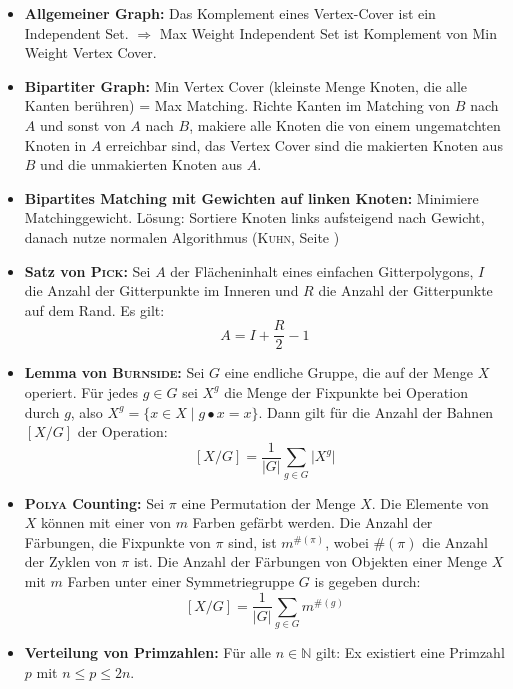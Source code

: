 \begin{itemize}
	\item \textbf{Allgemeiner Graph:}
	Das Komplement eines Vertex-Cover ist ein Independent Set.
	$\Rightarrow$ Max Weight Independent Set ist Komplement von Min Weight Vertex Cover.

	\item \textbf{Bipartiter Graph:}
	Min Vertex Cover (kleinste Menge Knoten, die alle Kanten berühren) = Max Matching.
	Richte Kanten im Matching von $B$ nach $A$ und sonst von $A$ nach $B$, makiere alle Knoten die von einem ungematchten Knoten in $A$ erreichbar sind, das Vertex Cover sind die makierten Knoten aus $B$ und die unmakierten Knoten aus $A$.

	\item \textbf{Bipartites Matching mit Gewichten auf linken Knoten:}
	Minimiere Matchinggewicht.
	Lösung: Sortiere Knoten links aufsteigend nach Gewicht, danach nutze normalen Algorithmus (\textsc{Kuhn}, Seite \pageref{kuhn})

	\item \textbf{Satz von \textsc{Pick}:}
	Sei $A$ der Flächeninhalt eines einfachen Gitterpolygons, $I$ die Anzahl der Gitterpunkte im Inneren und $R$ die Anzahl der Gitterpunkte auf dem Rand.
	Es gilt:\vspace*{-\baselineskip}
	\[
		A = I + \frac{R}{2} - 1
	\]

	\item \textbf{Lemma von \textsc{Burnside}:}
	Sei $G$ eine endliche Gruppe, die auf der Menge $X$ operiert.
	Für jedes $g \in G$ sei $X^g$ die Menge der Fixpunkte bei Operation durch $g$, also $X^g = \{x \in X \mid g \bullet x = x\}$.
	Dann gilt für die Anzahl der Bahnen $[X/G]$ der Operation:
	\[
		[X/G] = \frac{1}{\vert G \vert} \sum_{g \in G} \vert X^g \vert
	\]

	\item \textbf{\textsc{Polya} Counting:}
	Sei $\pi$ eine Permutation der Menge $X$.
	Die Elemente von $X$ können mit einer von $m$ Farben gefärbt werden.
	Die Anzahl der Färbungen, die Fixpunkte von $\pi$ sind, ist $m^{\#(\pi)}$, wobei $\#(\pi)$ die Anzahl der Zyklen von $\pi$ ist.
	Die Anzahl der Färbungen von Objekten einer Menge $X$ mit $m$ Farben unter einer Symmetriegruppe $G$ is gegeben durch:
	\[
		[X/G] = \frac{1}{\vert G \vert} \sum_{g \in G} m^{\#(g)}
	\]

	\item \textbf{Verteilung von Primzahlen:}
	Für alle $n \in \mathbb{N}$ gilt: Ex existiert eine Primzahl $p$ mit $n \leq p \leq 2n$.


\end{itemize}
